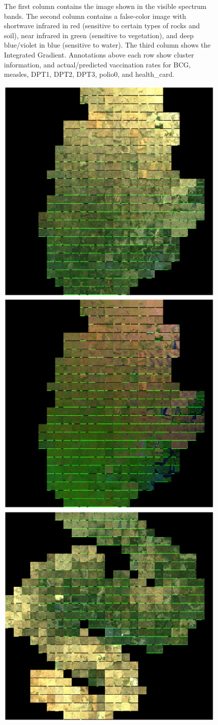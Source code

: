 \documentclass[]{article}
\begin{document}
\begin{figure}[p!]
\caption{The first column contains the image shown in the visible spectrum bands. The second column contains a false-color image with shortwave infrared in red (sensitive to certain types of rocks and soil), near infrared in green (sensitive to vegetation), and deep blue/violet in blue (sensitive to water). The third column shows the Integrated Gradient. Annotations above each row show cluster information, and actual/predicted vaccination rates for BCG, measles, DPT1, DPT2, DPT3, polio0, and health\_card.}
\label{fig:ig}
\end{figure}
\begin{figure}[p!]
\centering
\includegraphics[width=.45\linewidth]{tsne1.png}
\includegraphics[width=.45\linewidth]{tsne2.png}\\
\includegraphics[width=.45\linewidth]{tsne3.png}

\end{figure}
\end{document}
